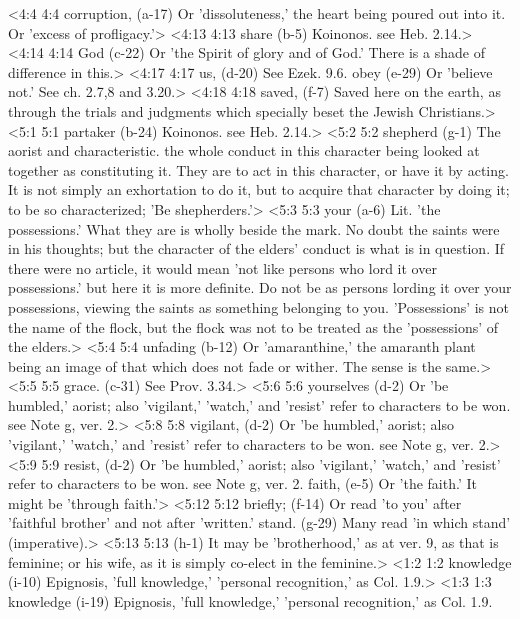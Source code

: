 <4:4 4:4  corruption, (a-17)  Or 'dissoluteness,' the heart being poured out into it. Or  'excess of profligacy.'>
<4:13 4:13  share (b-5)  Koinonos. see Heb. 2.14.>
<4:14 4:14  God (c-22)  Or 'the Spirit of glory and of God.' There is a shade of  difference in this.>
<4:17 4:17  us, (d-20)  See Ezek. 9.6.
  obey (e-29)  Or 'believe not.' See ch. 2.7,8 and 3.20.>
<4:18 4:18  saved, (f-7)  Saved here on the earth, as through the trials and judgments  which specially beset the Jewish Christians.>
<5:1 5:1  partaker (b-24)  Koinonos. see Heb. 2.14.>
<5:2 5:2  shepherd (g-1)  The aorist and characteristic. the whole conduct in this  character being looked at together as constituting it. They are  to act in this character, or have it by acting. It is not  simply an exhortation to do it, but to acquire that character  by doing it; to be so characterized; 'Be shepherders.'>
<5:3 5:3  your (a-6)  Lit. 'the possessions.' What they are is wholly beside the  mark. No doubt the saints were in his thoughts; but the  character of the elders' conduct is what is in question. If  there were no article, it would mean 'not like persons who lord  it over possessions.' but here it is more definite. Do not be  as persons lording it over your possessions, viewing the saints  as something belonging to you. 'Possessions' is not the name of  the flock, but the flock was not to be treated as the  'possessions' of the elders.>
<5:4 5:4  unfading (b-12)  Or 'amaranthine,' the amaranth plant being an image of that  which does not fade or wither. The sense is the same.>
<5:5 5:5  grace. (c-31)  See Prov. 3.34.>
<5:6 5:6  yourselves (d-2)  Or 'be humbled,' aorist; also 'vigilant,' 'watch,' and  'resist' refer to characters to be won. see Note g, ver. 2.>
<5:8 5:8  vigilant, (d-2)  Or 'be humbled,' aorist; also 'vigilant,' 'watch,' and  'resist' refer to characters to be won. see Note g, ver. 2.>
<5:9 5:9  resist, (d-2)  Or 'be humbled,' aorist; also 'vigilant,' 'watch,' and  'resist' refer to characters to be won. see Note g, ver. 2.
  faith, (e-5)  Or 'the faith.' It might be 'through faith.'>
<5:12 5:12  briefly; (f-14)  Or read 'to you' after 'faithful brother' and not after  'written.'
  stand. (g-29)  Many read 'in which stand' (imperative).>
<5:13 5:13   (h-1)  It may be 'brotherhood,' as at ver. 9, as that is feminine;  or his wife, as it is simply co-elect in the feminine.>
<1:2 1:2  knowledge (i-10)  Epignosis, 'full knowledge,' 'personal recognition,' as  Col. 1.9.>
<1:3 1:3  knowledge (i-19)  Epignosis, 'full knowledge,' 'personal recognition,' as  Col. 1.9.
